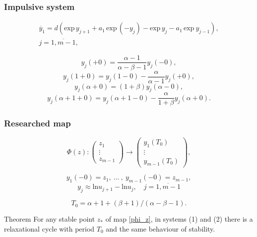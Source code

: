 \documentclass[fullscreen=true, unicode, bookmarks=false]{beamer}
\begin{document}
\begin{frame}
\frametitle{Impulsive system} 

\begin{eqnarray}\label{y_system}
\dot{y_1} = d(\mbox{exp}\,y_{j+1} + a_1\,\mbox{exp}\,(-y_j) - \mbox{exp}\,y_j - a_1\,\mbox{exp}\:y_{j-1}), \nonumber \\ j=\overline{1,m-1},
\end{eqnarray}

$$ y_j(+0) = \frac{\alpha -1}{\alpha - \beta - 1}y_j(-0), $$
$$ y_j(1+0) = y_j(1-0) - \frac{\alpha}{\alpha - 1}y_j(+0), $$
$$ y_j(\alpha + 0) = (1 + \beta)y_j(\alpha - 0), $$
$$ y_j(\alpha + 1 + 0) = y_j(\alpha + 1 - 0) - \frac{\alpha}{1 + \beta}y_j(\alpha + 0). $$

\end{frame}

\begin{frame}
\frametitle{Researched map} 
\begin{equation}\label{phi_z} 
	\Phi(z): \begin{pmatrix}
           z_1 \\
           \vdots \\
           z_{m-1}
          \end{pmatrix}
					\to
					\begin{pmatrix}
           y_1(T_0) \\
           \vdots \\
           y_{m-1}(T_0)
          \end{pmatrix},
\end{equation}

\vspace{0.2cm}

$$ y_1(-0) = z_1, \: \dots \: , \: y_{m-1}(-0) = z_{m-1}, $$
$$ y_j \approx \mbox{ln} u_{j+1} - \mbox{ln} u_j, \quad j=\overline{1,m-1} $$

$$ T_0 = \alpha + 1 + (\beta+1)/(\alpha - \beta - 1). $$
\pause
\begin{block}{Theorem}
For any stable point $z_{*}$ of map \eqref{phi_z}, in systems (1) and (2) there is a relaxational cycle with period $ T_0 $ and the same behaviour of stability.
\end{block}

\end{frame}
\end{document}
